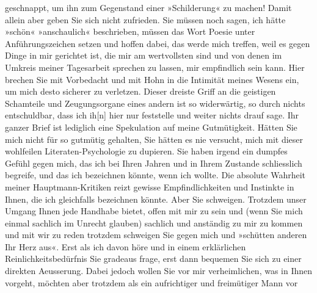 \begin{ledgroupsized}[t]{13cm}
               geschnappt, um ihn zum Gegenstand einer »Schilderung« zu machen!\pend
           \pstart
           Damit allein aber geben Sie sich nicht zufrieden. Sie müssen noch sagen, ich hätte
               »schön« »anschaulich« beschrieben, müssen das Wort Poesie unter Anführungszeichen
               setzen und hoffen dabei, das werde mich treffen, weil es gegen Dinge in mir gerichtet
               ist, die mir am wertvollsten sind und von denen im Umkreis meiner Tagesarbeit
               sprechen zu lassen, mir empfindlich sein kann. {\pb}Hier brechen Sie mit Vorbedacht
               und mit Hohn in die Intimität meines Wesens ein, um mich desto sicherer zu verletzen.
               Dieser dreiste Griff an die geistigen Schamteile und Zeugungsorgane eines andern ist
               so widerwärtig, so durch nichts entschuldbar, dass ich ih{[}n{]} hier
               nur feststelle und weiter nichts drauf sage.\pend
           \pstart
           Ihr ganzer Brief ist lediglich eine Spekulation auf meine Gutmütigkeit. Hätten Sie
               mich nicht für so gutmütig gehalten, Sie hätten es nie versucht, mich mit dieser
               wohlfeilen Literaten-Psychologie zu dupieren.\pend
           \pstart
           Sie haben irgend ein dumpfes Gefühl gegen mich, das ich bei Ihren Jahren und in Ihrem
               Zustande schliesslich begreife, und das ich bezeichnen könnte, wenn ich wollte. Die
               absolute Wahrheit meiner Hauptmann-Kritiken reizt gewisse
               Empfindlichkeiten und Instinkte in Ihnen, die ich gleichfalls bezeichnen könnte.\pend
           \pstart
           Aber Sie schweigen. Trotzdem unser Umgang Ihnen jede Handhabe bietet, offen mit mir
               zu sein und (wenn Sie mich einmal sachlich im Unrecht glauben) sachlich und anständig
               zu mir zu kommen und mit wir zu reden{\dotstwo} trotzdem schweigen
               Sie gegen mich und »schütten anderen Ihr Herz aus«. Erst als ich davon höre und in
               einem erklärlichen Reinlichkeitsbedürfnis Sie gradeaus frage, erst dann bequemen Sie
               sich zu einer direkten Aeusserung. Dabei jedoch wollen Sie vor mir verheimlichen, was
               in Ihnen vorgeht, möchten aber trotzdem als ein aufrichtiger und freimütiger Mann vor

\end{ledgroupsized}

